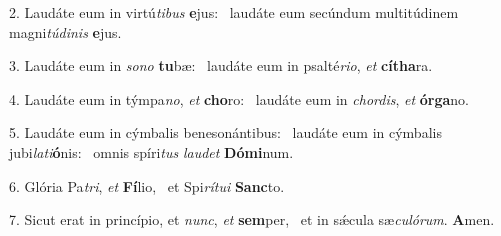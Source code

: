 2. Laudáte eum in virtú\textit{ti}\textit{bus} \textbf{e}jus: \ast\  laudáte eum secúndum multitúdinem magni\textit{tú}\textit{di}\textit{nis} \textbf{e}jus.\

3. Laudáte eum in \textit{so}\textit{no} \textbf{tu}bæ: \ast\  laudáte eum in psalté\textit{ri}\textit{o}, \textit{et} \textbf{cí}\textbf{tha}ra.\

4. Laudáte eum in týmpa\textit{no}, \textit{et} \textbf{cho}ro: \ast\  laudáte eum in \textit{chor}\textit{dis}, \textit{et} \textbf{ór}\textbf{ga}no.\

5. Laudáte eum in cýmbalis benesonántibus: \dag\  laudáte eum in cýmbalis jubi\textit{la}\textit{ti}\textbf{ó}nis: \ast\  omnis spíri\textit{tus} \textit{lau}\textit{det} \textbf{Dó}\textbf{mi}num.\

6. Glória Pa\textit{tri}, \textit{et} \textbf{Fí}lio, \ast\  et Spi\textit{rí}\textit{tu}\textit{i} \textbf{Sanc}to.\

7. Sicut erat in princípio, et \textit{nunc}, \textit{et} \textbf{sem}per, \ast\  et in sǽcula sæ\textit{cu}\textit{ló}\textit{rum}. \textbf{A}men.\

